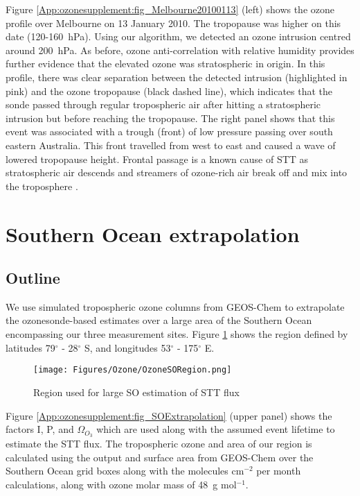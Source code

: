   Figure \ref{App:ozonesupplement:fig_Melbourne20100113} (left) shows the ozone profile over Melbourne on 13 January 2010.
  The tropopause was higher on this date (120-160~hPa).
  Using our algorithm, we detected an ozone intrusion centred around 200~hPa.
  As before, ozone anti-correlation with relative humidity provides further evidence that the elevated ozone was stratospheric in origin.
  In this profile, there was clear separation between the detected intrusion (highlighted in pink) and the ozone tropopause (black dashed line), which indicates that the sonde passed through regular tropospheric air after hitting a stratospheric intrusion but before reaching the tropopause.
  The right panel shows that this event was associated with a trough (front) of low pressure passing over south eastern Australia.
  This front travelled from west to east and caused a wave of lowered tropopause height. 
  Frontal passage is a known cause of STT as stratospheric air descends and streamers of ozone-rich air break off and mix into the troposphere \parencite{Sprenger2003}.
  
  \section{Southern Ocean extrapolation}
  \label{App:ozonesupplement:SOExtrapolation}
  
  \subsection{Outline}
  We use simulated tropospheric ozone columns from GEOS-Chem to extrapolate the ozonesonde-based estimates over a large area of the Southern Ocean encompassing our three measurement sites. 
  Figure \ref{App:ozonesupplement:fig_SORegion} shows the region defined by latitudes 79$^{\circ}$ - 28$^{\circ}$ S, and longitudes 53$^{\circ}$ - 175$^{\circ}$ E.
  
  \begin{figure}[t]
    \texttt{[image: Figures/Ozone/OzoneSORegion.png]}
    \caption{%
      Region used for large SO estimation of STT flux}
    \label{App:ozonesupplement:fig_SORegion}
  \end{figure}
  
  Figure \ref{App:ozonesupplement:fig_SOExtrapolation} (upper panel) shows the factors I, P, and $\Omega_{O_3}$ which are used along with the assumed event lifetime to estimate the STT flux.
  The tropospheric ozone and area of our region is calculated using the output and surface area from GEOS-Chem over the Southern Ocean grid boxes along with the molecules cm$^{-2}$ per month calculations, along with ozone molar mass of 48~g mol$^{-1}$.
  
